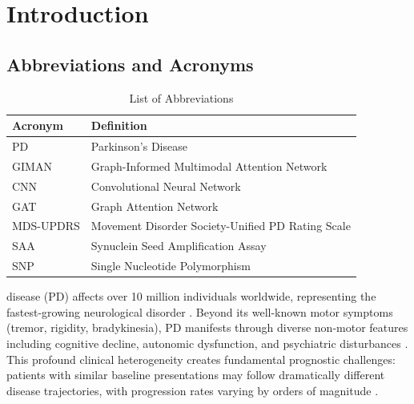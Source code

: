 \documentclass[journal,twoside,web]{ieeecolor}
\begin{document}
\section{Introduction}
\label{sec:introduction}

\subsection{Abbreviations and Acronyms}
\begin{table}[h]
\caption{List of Abbreviations}
\label{tab:abbreviations}
\begin{tabular}{ll}
\textbf{Acronym} & \textbf{Definition} \\
\hline
PD & Parkinson's Disease \\
GIMAN & Graph-Informed Multimodal Attention Network \\
CNN & Convolutional Neural Network \\
GAT & Graph Attention Network \\
MDS-UPDRS & Movement Disorder Society-Unified PD Rating Scale \\
SAA & Synuclein Seed Amplification Assay \\
SNP & Single Nucleotide Polymorphism \\
\hline
\end{tabular}
\end{table}

 disease (PD) affects over 10 million individuals worldwide, representing the fastest-growing neurological disorder \cite{dorsey2018parkinsons}. Beyond its well-known motor symptoms (tremor, rigidity, bradykinesia), PD manifests through diverse non-motor features including cognitive decline, autonomic dysfunction, and psychiatric disturbances \cite{schapira2017nonmotor}. This profound clinical heterogeneity creates fundamental prognostic challenges: patients with similar baseline presentations may follow dramatically different disease trajectories, with progression rates varying by orders of magnitude \cite{fereshtehnejad2017clinical}.
\end{document}
